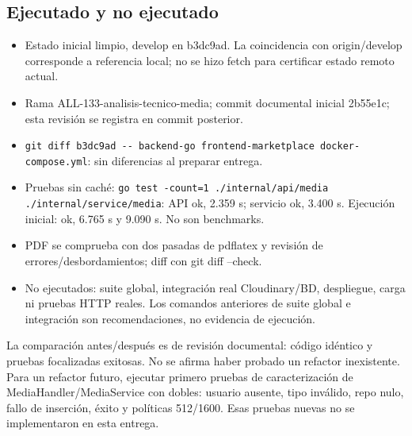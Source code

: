 \documentclass[11pt,a4paper]{article}
\begin{document}
\subsection{Ejecutado y no ejecutado}
\begin{itemize}
\item Estado inicial limpio, develop en b3dc9ad. La coincidencia con origin/develop corresponde a referencia local; no se hizo fetch para certificar estado remoto actual.
\item Rama ALL-133-analisis-tecnico-media; commit documental inicial 2b55e1c; esta revisión se registra en commit posterior.
\item \nolinkurl{git diff b3dc9ad -- backend-go frontend-marketplace docker-compose.yml}: sin diferencias al preparar entrega.
\item Pruebas sin caché: \nolinkurl{go test -count=1 ./internal/api/media ./internal/service/media}: API ok, 2.359 s; servicio ok, 3.400 s. Ejecución inicial: ok, 6.765 s y 9.090 s. No son benchmarks.
\item PDF se comprueba con dos pasadas de pdflatex y revisión de errores/desbordamientos; diff con git diff --check.
\item No ejecutados: suite global, integración real Cloudinary/BD, despliegue, carga ni pruebas HTTP reales. Los comandos anteriores de suite global e integración son recomendaciones, no evidencia de ejecución.
\end{itemize}
La comparación antes/después es de revisión documental: código idéntico y pruebas focalizadas exitosas. No se afirma haber probado un refactor inexistente. Para un refactor futuro, ejecutar primero pruebas de caracterización de MediaHandler/MediaService con dobles: usuario ausente, tipo inválido, repo nulo, fallo de inserción, éxito y políticas 512/1600. Esas pruebas nuevas no se implementaron en esta entrega.
\end{document}
